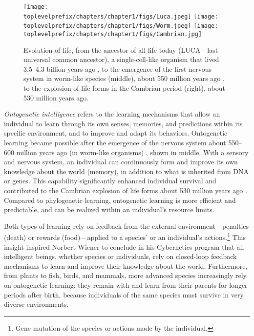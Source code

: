 \documentclass[../../book-main.tex]{subfiles}
\begin{document}
\begin{figure}
    \centering
    \texttt{[image: \\toplevelprefix/chapters/chapter1/figs/Luca.jpeg]}
    \texttt{[image: \\toplevelprefix/chapters/chapter1/figs/Worm.jpeg]}
    \texttt{[image: \\toplevelprefix/chapters/chapter1/figs/Cambrian.jpg]}
    \caption{Evolution of life, from the ancestor of all life today (LUCA---last universal common ancestor), a single-cell-like organism that lived 3.5--4.3 billion years ago \cite{moody2024nature}, to the emergence of the first nervous system in worm-like species (middle), about 550 million years ago \cite{wang2025preservation}, to the explosion of life forms in the Cambrian period (right), about 530 million years ago.}
    \label{fig:evolution}
\end{figure}

\textit{Ontogenetic intelligence} refers to the learning mechanisms that allow an individual to learn through its own senses, memories, and predictions within its specific environment, and to improve and adapt its behaviors. Ontogenetic learning became possible after the emergence of the nervous system about 550--600 million years ago (in worm-like organisms) \cite{wang2025preservation}, shown in  middle. With a sensory and nervous system, an individual can continuously form and improve its own knowledge about the world (memory), in addition to what is inherited from DNA or genes. This capability significantly enhanced individual survival and contributed to the Cambrian explosion of life forms about 530 million years ago \cite{Parker-2004}. Compared to phylogenetic learning, ontogenetic learning is more efficient and predictable, and can be realized within an individual's resource limits.

Both types of learning rely on feedback from the external environment---penalties (death) or rewards (food)---applied to a species' or an individual's actions.\footnote{Gene mutation of the species or actions made by the individual.} This insight inspired Norbert Wiener to conclude in his Cybernetics program \cite{Wiener-Cybernetics-1948} that all intelligent beings, whether species or individuals, rely on closed-loop feedback mechanisms to learn and improve their knowledge about the world. Furthermore, from plants to fish, birds, and mammals, more advanced species increasingly rely on ontogenetic learning: they remain with and learn from their parents for longer periods after birth, because individuals of the same species must survive in very diverse environments.
\end{document}
